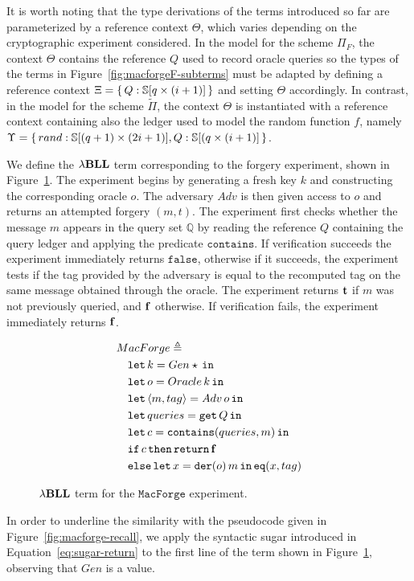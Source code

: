 It is worth noting that the type derivations of the terms introduced so far are parameterized by a reference context $\Theta$, which varies depending on the cryptographic experiment considered. In the model for the scheme $\Pi_F$, the context $\Theta$ contains the reference $Q$ used to record oracle queries so the types of the terms in Figure~\ref{fig:macforgeF-subterms} must be adapted by defining a reference context $\Xi=\{\,Q: \mathbb{S}[q\times(i+1)]\,\}$ and setting $\Theta$ accordingly. In contrast, in the model for the scheme $\widetilde{\Pi}$, the context $\Theta$ is instantiated with a reference context containing also the ledger used to model the random function $f$, namely $\Upsilon=\{\,rand : \mathbb{S}[(q+1)\times(2i+1)], Q: \mathbb{S}[(q\times(i+1)]\,\}$.

We define the ${\lambda}\mathbf{BLL}$ term corresponding to the forgery experiment, shown in Figure~\ref{fig:macforge-term}. The experiment begins by generating a fresh key $k$ and constructing the corresponding oracle $o$. The adversary $Adv$ is then given access to $o$ and returns an attempted forgery $(m,t)$. The experiment first checks  whether the message $m$ appears in the query set $\mathbb{Q}$ by reading the reference $Q$ containing the query ledger and applying the predicate $\mathtt{contains}$. If verification succeeds the experiment immediately returns $\mathtt{false}$, otherwise if it succeeds, the experiment tests if the tag provided by the adversary is equal to the recomputed tag on the same message obtained through the oracle. The experiment returns $\mathbf{t}$ if $m$ was not previously queried, and $\mathbf{f}$ otherwise. If verification fails, the experiment immediately returns $\mathbf{f}$.

\begin{figure}[ht]
    \centering
    \begin{align*}
    &MacForge \triangleq \\
    &\quad \mathtt{let}\,k = Gen \star\,\mathtt{in}\, \\
    &\quad \mathtt{let}\,o = Oracle\, k\,\mathtt{in}\, \\
    &\quad \mathtt{let}\,\langle m,tag \rangle = Adv\, o\,\mathtt{in}\, \\
    &\quad \mathtt{let}\,queries = \mathtt{get}\, Q\,\mathtt{in}\, \\
    &\quad \mathtt{let}\,c=\mathtt{contains}(queries, m)\,\mathtt{in}\, \\
    &\quad \mathtt{if}\, c\, \mathtt{then}\, \mathtt{return}\, \mathbf{f} \\
    &\quad \mathtt{else}\,\mathtt{let}\,x=\mathtt{der}(o)\, m\,\mathtt{in}\, \mathtt{eq}(x,tag)
    \end{align*}
    \caption{${\lambda}\mathbf{BLL}$ term for the $\mathtt{MacForge}$ experiment.}
    \label{fig:macforge-term}
\end{figure}
In order to underline the similarity with the pseudocode given in Figure~\ref{fig:macforge-recall}, we apply the syntactic sugar introduced in Equation~\ref{eq:sugar-return} to the first line of the term shown in Figure~\ref{fig:macforge-term}, observing that $Gen$ is a value.

